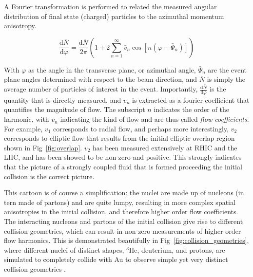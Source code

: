 A Fourier transformation is performed to related the measured angular distribution of final state (charged) particles to the azimuthal momentum anisotropy. 

  \begin{equation}
    \frac{\mathrm{d}\bar{N}}{\mathrm{d}\varphi} = \frac{\mathrm{d}\bar{N}}{2\pi} \left(1 + 2\sum^\infty_{n=1}\bar{v}_n\cos[n(\varphi - \bar\Psi_n)]\right)
  \end{equation}

  With $\varphi$ as the angle in the transverse plane, or azimuthal angle, $\bar\Psi_n$ are the event plane angles determined with respect to the beam direction, and $\bar{N}$ is simply the average number of particles of interest in the event. Importantly, $\frac{\mathrm{d}\bar{N}}{\mathrm{d}\varphi}$ is the quantity that is directly measured, and $v_n$ is extracted as a fourier coefficient that quantifies the magnitude of flow. The subscript $n$ indicates the order of the harmonic, with $v_n$ indicating the kind of flow and are thus called \textit{flow coefficients}. For example, $v_1$ corresponds to radial flow, and perhaps more interestingly, $v_2$ corresponds to elliptic flow that results from the initial elliptic overlap region shown in Fig~\ref{fig:overlap}. $v_2$ has been measured extensively at RHIC and the LHC, and has been showed to be non-zero and positive. This strongly indicates that the picture of a strongly coupled fluid that is formed proceeding the initial collision is the correct picture.  

  This cartoon is of course a simplification: the nuclei are made up of nucleons (in tern made of partons) and are quite lumpy, resulting in more complex spatial anisotropies in the initial collision, and therefore higher order flow coefficients. The interacting nucleons and partons of the initial collision give rise to different collision geometries, which can result in non-zero measurements of higher order flow harmonics. This is demonstrated beautifully in Fig~\ref{fig:collision_geometries}, where different nuclei of distinct shapes, $^3$He, deuterium, and protons, are simulated to completely collide with Au to observe simple yet very distinct collision geometries \cite{Aidala2019}. 
  
